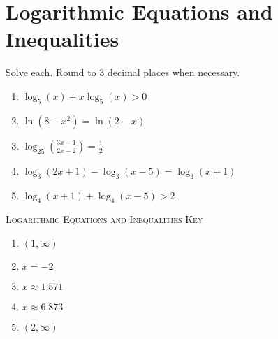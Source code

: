 \chapter{Logarithmic Equations and Inequalities}

Solve each. Round to 3 decimal places when necessary.
\begin{enumerate}
	\item $\log_5(x) + x\log_5(x) > 0$
	\item $\ln\left(8-x^2\right) = \ln(2-x)$
	\item $\log_{25}\left(\frac{3x+1}{2x-2}\right) = \frac{1}{2}$
	\item $\log_3(2x+1)-\log_3(x-5) = \log_3(x+1)$
	\item $\log_4(x+1) + \log_4(x-5) > 2$
\end{enumerate}

\newpage

\textsc{Logarithmic Equations and Inequalities Key}

\begin{enumerate}
	\item $(1, \infty)$
	\item $x = -2$
	\item $x \approx 1.571$
	\item $x \approx 6.873$
	\item $(2, \infty)$
\end{enumerate}
